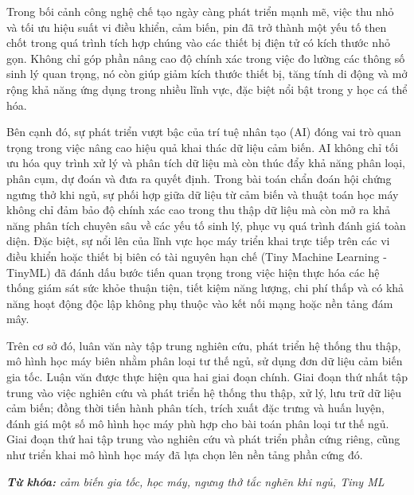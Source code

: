 Trong bối cảnh công nghệ chế tạo ngày càng phát triển mạnh mẽ, việc thu nhỏ và
tối ưu hiệu suất vi điều khiển, cảm biến, pin đã trở thành một yếu tố then chốt
trong quá trình tích hợp chúng vào các thiết bị điện tử có kích thước nhỏ gọn.
Không chỉ góp phần nâng cao độ chính xác trong việc đo lường các thông số sinh
lý quan trọng, nó còn giúp giảm kích thước thiết bị, tăng tính di động và mở
rộng khả năng ứng dụng trong nhiều lĩnh vực, đặc biệt nổi bật trong y học cá
thể hóa.

Bên cạnh đó, sự phát triển vượt bậc của trí tuệ nhân tạo (AI) đóng vai trò quan
trọng trong việc nâng cao hiệu quả khai thác dữ liệu cảm biến. AI không chỉ tối
ưu hóa quy trình xử lý và phân tích dữ liệu mà còn thúc đẩy khả năng phân loại,
phân cụm, dự đoán và đưa ra quyết định. Trong bài toán chẩn đoán hội chứng
ngưng thở khi ngủ, sự phối hợp giữa dữ liệu từ cảm biến và thuật toán học máy
không chỉ đảm bảo độ chính xác cao trong thu thập dữ liệu mà còn mở ra khả năng
phân tích chuyên sâu về các yếu tố sinh lý, phục vụ quá trình đánh giá toàn
diện. Đặc biệt, sự nổi lên của lĩnh vực học máy triển khai trực tiếp trên các
vi điều khiển hoặc thiết bị biên có tài nguyên hạn chế (Tiny Machine Learning -
TinyML) đã đánh dấu bước tiến quan trọng trong việc hiện thực hóa các hệ thống
giám sát sức khỏe thuận tiện, tiết kiệm năng lượng, chi phí thấp và có khả năng
hoạt động độc lập không phụ thuộc vào kết nối mạng hoặc nền tảng đám mây.

Trên cơ sở đó, luân văn này tập trung nghiên cứu, phát triển hệ thống thu thập,
mô hình học máy biên nhằm phân loại tư thế ngủ, sử dụng đơn dữ liệu cảm biến
gia tốc. Luận văn được thực hiện qua hai giai đoạn chính. Giai đoạn thứ nhất
tập trung vào việc nghiên cứu và phát triển hệ thống thu thập, xử lý, lưu trữ
dữ liệu cảm biến; đồng thời tiến hành phân tích, trích xuất đặc trưng và huấn
luyện, đánh giá một số mô hình học máy phù hợp cho bài toán phân loại tư thế
ngủ. Giai đoạn thứ hai tập trung vào nghiên cứu và phát triển phần cứng riêng,
cũng như triển khai mô hình học máy đã lựa chọn lên nền tảng phần cứng đó.

\vspace{-0.5cm}
\begin{flushleft}
	\textit{\textbf{Từ khóa: } cảm biến gia tốc, học máy, ngưng thở tắc nghẽn khi ngủ,  Tiny ML}
\end{flushleft}

\changefontsizes[16pt]{13pt}
